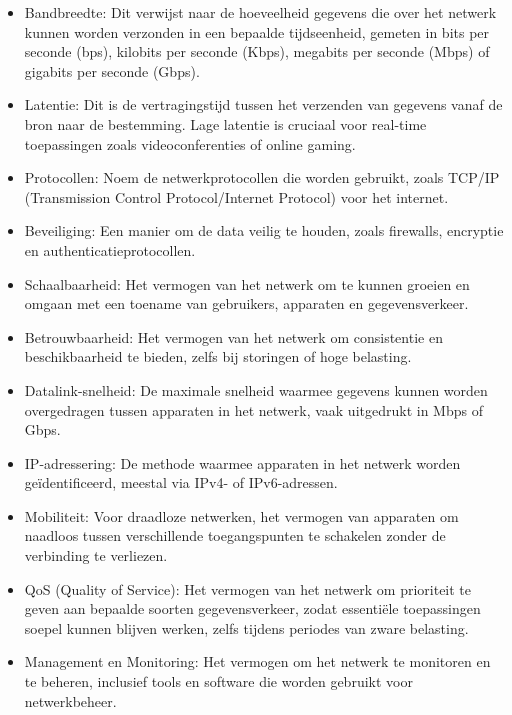 \begin{itemize}
    \item Bandbreedte: Dit verwijst naar de hoeveelheid gegevens die over het netwerk kunnen worden verzonden in een bepaalde tijdseenheid, gemeten in bits per seconde (bps), kilobits per seconde (Kbps), megabits per seconde (Mbps) of gigabits per seconde (Gbps). \cite{Bandbreedte}
    \item Latentie: Dit is de vertragingstijd tussen het verzenden van gegevens vanaf de bron naar de bestemming. Lage latentie is cruciaal voor real-time toepassingen zoals videoconferenties of online gaming. \cite{Bandbreedte}
    \item Protocollen: Noem de netwerkprotocollen die worden gebruikt, zoals TCP/IP (Transmission Control Protocol/Internet Protocol) voor het internet.
    \item Beveiliging: Een manier om de data veilig te houden, zoals firewalls, encryptie en authenticatieprotocollen.
    \item Schaalbaarheid: Het vermogen van het netwerk om te kunnen groeien en omgaan met een toename van gebruikers, apparaten en gegevensverkeer.
    \item Betrouwbaarheid: Het vermogen van het netwerk om consistentie en beschikbaarheid te bieden, zelfs bij storingen of hoge belasting.
    \item Datalink-snelheid: De maximale snelheid waarmee gegevens kunnen worden overgedragen tussen apparaten in het netwerk, vaak uitgedrukt in Mbps of Gbps.
    \item IP-adressering: De methode waarmee apparaten in het netwerk worden geïdentificeerd, meestal via IPv4- of IPv6-adressen.
    \item Mobiliteit: Voor draadloze netwerken, het vermogen van apparaten om naadloos tussen verschillende toegangspunten te schakelen zonder de verbinding te verliezen.
    \item QoS (Quality of Service): Het vermogen van het netwerk om prioriteit te geven aan bepaalde soorten gegevensverkeer, zodat essentiële toepassingen soepel kunnen blijven werken, zelfs tijdens periodes van zware belasting.
    \item Management en Monitoring: Het vermogen om het netwerk te monitoren en te beheren, inclusief tools en software die worden gebruikt voor netwerkbeheer.

\end{itemize}
